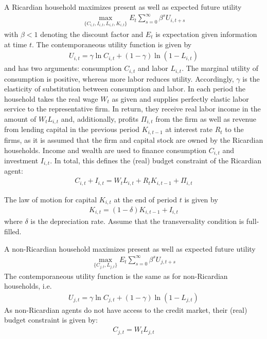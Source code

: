 \documentclass{article}
\begin{document}
A Ricardian household maximizes present as well as expected future utility
\begin{align*}
\underset{\{C_{i,t},I_{i,t},L_{i,t},K_{i,t}\}}{\max} E_t \sum_{s=0}^{\infty} \beta^{s} U_{i,t+s}
\end{align*}
with \(\beta <1\) denoting the discount factor and \(E_t\) is expectation given information at time \(t\).
The contemporaneous utility function is given by
\begin{align*}
U_{i,t} = \gamma \ln C_{i,t} + (1-\gamma) \ln{(1-L_{i,t})}
\end{align*}
and has two arguments: consumption \(C_{i,t}\) and labor \(L_{i,t}\).
The marginal utility of consumption is positive, whereas more labor reduces utility.
Accordingly, \(\gamma \) is the elasticity of substitution between consumption and labor.
In each period the household takes the real wage \(W_t\) as given
  and supplies perfectly elastic labor service to the representative firm.
In return, they receive real labor income in the amount of \(W_t L_{i,t}\)
  and, additionally, profits \(\Pi_{i,t}\) from the firm
  as well as revenue from lending capital in the previous period \(K_{i,t-1}\) at interest rate \(R_t\) to the firms,
  as it is assumed that the firm and capital stock are owned by the Ricardian households.
Income and wealth are used to finance consumption \(C_{i,t}\) and investment \(I_{i,t}\).
In total, this defines the (real) budget constraint of the Ricardian agent:
\begin{align*}
C_{i,t} + I_{i,t} = W_t L_{i,t} + R_t K_{i,t-1} + \Pi_{i,t}
\end{align*}

The law of motion for capital \(K_{i,t}\) at the end of period \(t\) is given by
\begin{align*}
K_{i,t} = (1-\delta)K_{i,t-1} + I_{i,t}
\end{align*}
where \(\delta \) is the depreciation rate.
Assume that the transversality condition is full-filled.

A non-Ricardian household maximizes present as well as expected future utility
\begin{align*}
\underset{\{C_{j,t},L_{j,t}\}}{\max} E_t \sum_{s=0}^{\infty} \beta^{s} U_{j,t+s}
\end{align*}
The contemporaneous utility function is the same as for non-Ricardian households, i.e.\
\begin{align*}
U_{j,t} = \gamma \ln C_{j,t} + (1-\gamma) \ln{(1-L_{j,t})}
\end{align*}
As non-Ricardian agents do not have access to the credit market, their (real) budget constraint is given by:
\begin{align*}
C_{j,t} = W_t L_{j,t}
\end{align*}
\end{document}
